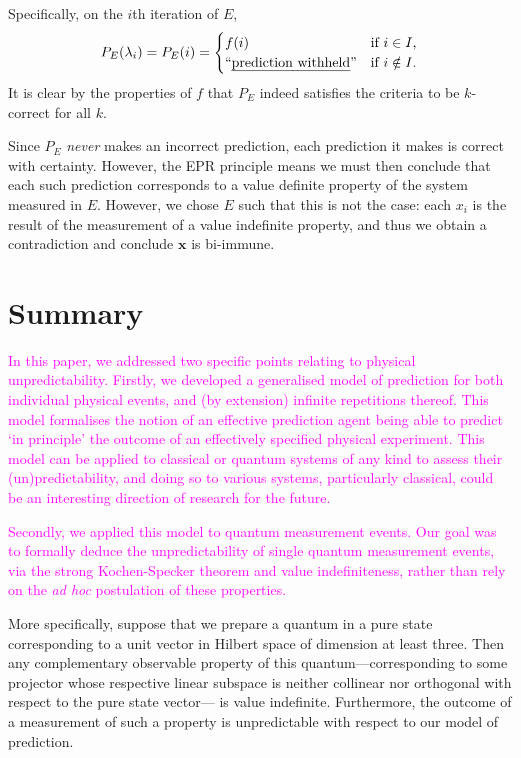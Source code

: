 \documentclass[%
 superscriptaddress,
 preprint,
 showpacs,
 showkeys,
 preprintnumbers,
  amsmath,amssymb,
  aps,
 pra,
  longbibliography,
  floatfix,
 ]{revtex4-1}
\theoremstyle{definition}
\newcommand{\x}{\mathbf{x}}
\begin{document}
Specifically, on the $i$th iteration of $E$, $$P_E(\lambda_i)=P_E(i)=\begin{cases}f(i) & \text{if $i\in I$,}\\\text{``\emph{prediction withheld}''} & \text{if $i\notin I$.}\end{cases}$$
It is clear by the properties of $f$ that $P_E$ indeed satisfies the criteria to be $k$-correct for all $k$.

Since $P_E$ \emph{never} makes an incorrect prediction, each prediction it makes is correct with certainty.
However, the EPR principle means we must then conclude that each such prediction corresponds to a value definite property of the system measured in $E$.
However, we chose $E$ such that this is not the case: each $x_i$ is the result of the measurement of a value indefinite property, and thus we obtain a contradiction and conclude $\x$ is bi-immune.
\fi


\section{Summary}


\textcolor{magenta}{
In this paper, we addressed two specific points relating to physical unpredictability.
Firstly, we developed a generalised model of prediction for both individual physical events, and (by extension) infinite repetitions thereof.
This model formalises the notion of an effective prediction agent being able to predict `in principle' the outcome of an effectively specified physical experiment.
This model can be applied to classical or quantum systems of any kind to assess their (un)predictability, and doing so to various systems, particularly classical, could be an interesting direction of research for the future.
}

\textcolor{magenta}{
Secondly, we  applied this model to quantum measurement events.
Our goal was to formally deduce the unpredictability of single quantum measurement events, via the strong Kochen-Specker theorem and value indefiniteness, rather than rely on the \emph{ad hoc} postulation of these properties.
}

More specifically,  suppose that we prepare a quantum in a pure state corresponding %
to a unit vector in Hilbert space of dimension at least three. Then any complementary
observable property of this quantum---corresponding to some projector whose respective
linear subspace is neither collinear nor orthogonal with respect to the pure state vector---%
is value indefinite.
Furthermore,  the outcome of a measurement of such a property is unpredictable with respect to our model of prediction.
\end{document}
